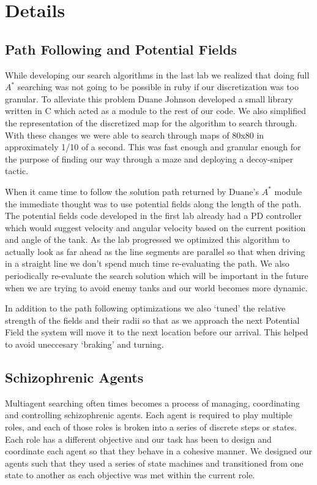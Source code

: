 \chapter{Details}\label{chap:details}
\section{Path Following and Potential Fields}
While developing our search algorithms in the last lab we realized that doing full $A^*$ searching was not going to be possible in ruby if our discretization was too granular. To alleviate this problem Duane Johnson developed a small library written in C which acted as a module to the rest of our code.  We also simplified the representation of the discretized map for the algorithm to search through.  With these changes we were able to search through maps of 80x80 in approximately 1/10 of a second.  This was fast enough and granular enough for the purpose of finding our way through a maze and deploying a decoy-sniper tactic.
\par
When it came time to follow the solution path returned by Duane's $A^*$ module the immediate thought was to use potential fields along the length of the path.  The potential fields code developed in the first lab already had a PD controller which would suggest velocity and angular velocity based on the current position and angle of the tank.  As the lab progressed we optimized this algorithm to actually look as far ahead as the line segments are parallel so that when driving in a straight line we don't spend much time re-evaluating the path.  We also periodically re-evaluate the search solution which will be important in the future when we are trying to avoid enemy tanks and our world becomes more dynamic.
\par
In addition to the path following optimizations we also `tuned' the relative strength of the fields and their radii so that as we approach the next Potential Field the system will move it to the next location before our arrival.  This helped to avoid uneccesary `braking' and turning.

\section{Schizophrenic Agents}

Multiagent searching often times becomes a process of managing, coordinating and controlling schizophrenic agents.   Each agent is required to play multiple roles, and each of those roles is broken into a series of discrete steps or states.  Each role has a different objective and our task has been to design and coordinate each agent so that they behave in a cohesive manner. We designed our agents such that they used a series of state machines and transitioned from one state to another as each objective was met within the current role. 

